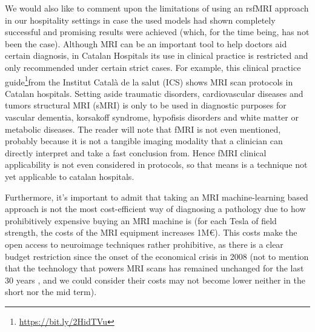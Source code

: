 \documentclass[a4paper,12pt]{elsarticle}  %
\begin{document}
	
	We would also like to comment upon the limitations of using an rsfMRI approach in our hospitality settings in case the used models had shown completely successful and promising results were achieved (which, for the time being, has not been the case). Although MRI can be an important tool to help doctors aid certain diagnosis, in Catalan Hospitals its use in clinical practice is restricted and only recommended under certain strict cases. For example, this clinical practice guide\cite{ics_practica_clinica}\footnote{\href{https://bit.ly/2HidTVu}{https://bit.ly/2HidTVu}}from the Institut Català de la salut (ICS) shows MRI scan protocols in Catalan hospitals. Setting aside traumatic disorders, cardiovascular diseases and tumors structural MRI (sMRI) is only to be used in diagnostic purposes for vascular dementia, korsakoff syndrome, hypofisis disorders and white matter or metabolic diseases. The reader will note that fMRI is not even mentioned, probably because it is not a tangible imaging modality that a clinician can directly interpret and take a fast conclusion from. Hence fMRI clinical applicability is not even considered in protocols, so that means is a technique not yet applicable to catalan hospitals.
	
	Furthermore, it's important to admit that taking an MRI machine-learning based approach is not the most cost-efficient way of diagnosing a pathology due to how prohibitively expensive buying an MRI machine is (for each Tesla of field strength, the costs of the MRI equipment increases 1M\euro \cite{Sarracanie2015}). This costs make the open access to neuroimage techniques rather prohibitive, as there is a clear budget restriction since the onset of the economical crisis in 2008 (not to mention that the technology that powers MRI scans has remained unchanged for the last 30 years \cite{Sarracanie2015}, and we could consider their costs may not become lower neither in the short nor the mid term).
	
\end{document}
